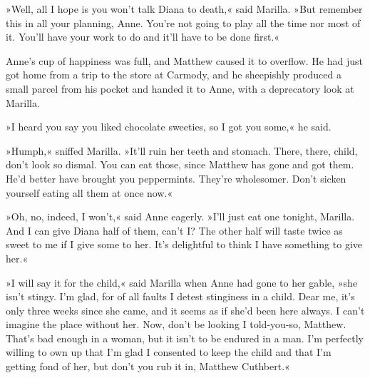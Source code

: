 »Well, all I hope is you won’t talk Diana to death,« said Marilla. »But remember this in all your planning, Anne. You’re not going to play all the time nor most of it. You’ll have your work to do and it’ll have to be done first.«

Anne’s cup of happiness was full, and Matthew caused it to overflow. He had just got home from a trip to the store at Carmody, and he sheepishly produced a small parcel from his pocket and handed it to Anne, with a deprecatory look at Marilla.

»I heard you say you liked chocolate sweeties, so I got you some,« he said.

»Humph,« sniffed Marilla. »It’ll ruin her teeth and stomach. There, there, child, don’t look so dismal. You can eat those, since Matthew has gone and got them. He’d better have brought you peppermints. They’re wholesomer. Don’t sicken yourself eating all them at once now.«

»Oh, no, indeed, I won’t,« said Anne eagerly. »I’ll just eat one tonight, Marilla. And I can give Diana half of them, can’t I? The other half will taste twice as sweet to me if I give some to her. It’s delightful to think I have something to give her.«

»I will say it for the child,« said Marilla when Anne had gone to her gable, »she isn’t stingy. I’m glad, for of all faults I detest stinginess in a child. Dear me, it’s only three weeks since she came, and it seems as if she’d been here always. I can’t imagine the place without her. Now, don’t be looking I told-you-so, Matthew. That’s bad enough in a woman, but it isn’t to be endured in a man. I’m perfectly willing to own up that I’m glad I consented to keep the child and that I’m getting fond of her, but don’t you rub it in, Matthew Cuthbert.«